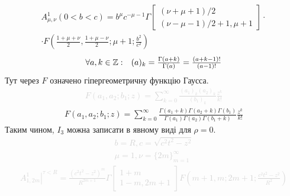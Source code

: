 %
\begin{equation*} \begin{aligned}
A_{\mu,\nu}^1 \left( 0 < b < c \right) = b^{\mu} c^{-\mu-1} 
\Gamma \left[ \begin{array}{l} 
(\nu+\mu+1)/2 \\ (\nu-\mu-1)/2 + 1, \mu + 1 \end{array} \right] \cdot
\\ \cdot F \left(  \frac{1+\mu+\nu}{2}, \frac{1+\mu-\nu}{2}; 
\mu+1; \frac{b^2}{c^2} \right)
\end{aligned} \end{equation*}
%
\textcolor{lightgray}{ \begin{equation*} \begin{aligned}
\begin{array}{lr} \forall a,k \in \mathbb{Z}: &
(a)_k = \frac{\Gamma(a+k)}{\Gamma(a)} = \frac{(a+k-1)!}{(a-1)!} \end{array}
\end{aligned} \end{equation*} }
%
Тут через $ F $ означено гіпергеометричну функцію Гаусса.
%
\textcolor{lightgray}{ \begin{equation*} \begin{aligned}
F (a_1, a_2; b_1; z) = \sum_{k=0}^\infty 
\frac{(a_1)_k (a_2)_k}{(b_1)_k} \frac{z^k}{k!} 
\end{aligned} \end{equation*} }
%
\begin{equation*} \begin{aligned}
F (a_1, a_2; b_1; z) = \sum_{k=0}^\infty 
\frac{\Gamma(a_1+k) \Gamma(a_2+k) \Gamma(b_1)}
{\Gamma(a_1) \Gamma(a_2) \Gamma(b_1+k)} \frac{z^k}{k!}
\end{aligned} \end{equation*}
%
Таким чином, $ I_3 $ можна записати в явному виді для $ \rho = 0 $.
%
\textcolor{lightgray}{ \begin{equation*} \begin{aligned}
b = R, c = \sqrt{c^2t^2-z^2} \\
\mu = 1, \nu = \{ 2m \}_{m=1}^{\infty}
\end{aligned} \end{equation*} }
%
\textcolor{lightgray}{ \begin{equation*} \begin{aligned}
\left. A_{1,2m}^1 \right|^{\tau < R} =
\frac{(c^2t^2-z^2)^m}{R^{2m+1}}
\Gamma \left[ \begin{array}{l} 1+m \\ 1-m, 2m + 1 \end{array} \right]
F \left( m+1, m; 2m+1; \frac{c^2t^2-z^2}{R^2} \right)
\end{aligned} \end{equation*} }
